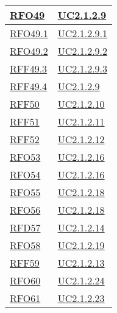 \begin{longtable}{|>{\centering}m{5cm}|m{5cm}<{\centering}|}
	\hyperlink{RFO49}{RFO49} & \hyperref[UC2.1.2.9]{UC2.1.2.9}\\ \hline
	
	\hyperlink{RFO49.1}{RFO49.1} & \hyperref[UC2.1.2.9.1]{UC2.1.2.9.1}\\ \hline
	
	\hyperlink{RFO49.2}{RFO49.2} & \hyperref[UC2.1.2.9.2]{UC2.1.2.9.2}\\ \hline
	
	\hyperlink{RFF49.3}{RFF49.3} & \hyperref[UC2.1.2.9.3]{UC2.1.2.9.3}\\ \hline
	
	\hyperlink{RFF49.4}{RFF49.4} & \hyperref[UC2.1.2.9]{UC2.1.2.9}\\ \hline
	
	\hyperlink{RFF50}{RFF50} & \hyperref[UC2.1.2.10]{UC2.1.2.10}\\ \hline
	
	\hyperlink{RFF51}{RFF51} & \hyperref[UC2.1.2.11]{UC2.1.2.11}\\ \hline
	
	\hyperlink{RFF52}{RFF52} & \hyperref[UC2.1.2.12]{UC2.1.2.12}\\ \hline
	
	\hyperlink{RFO53}{RFO53} & \hyperref[UC2.1.2.16]{UC2.1.2.16}\\ \hline
	
	\hyperlink{RFO54}{RFO54} & \hyperref[UC2.1.2.16]{UC2.1.2.16}\\ \hline
	
	\hyperlink{RFO55}{RFO55} & \hyperref[UC2.1.2.18]{UC2.1.2.18}\\ \hline
	
	\hyperlink{RFO56}{RFO56} & \hyperref[UC2.1.2.18]{UC2.1.2.18}\\ \hline
	
	\hyperlink{RFD57}{RFD57} & \hyperref[UC2.1.2.14]{UC2.1.2.14}\\ \hline
	
	\hyperlink{RFO58}{RFO58} & \hyperref[UC2.1.2.19]{UC2.1.2.19}\\ \hline
	
	\hyperlink{RFF59}{RFF59} & \hyperref[UC2.1.2.13]{UC2.1.2.13}\\ \hline
	
	\hyperlink{RFO60}{RFO60} & \hyperref[UC2.1.2.24]{UC2.1.2.24}\\ \hline
	
	\hyperlink{RFO61}{RFO61} & \hyperref[UC2.1.2.23]{UC2.1.2.23}\\ \hline
	

\end{longtable}
